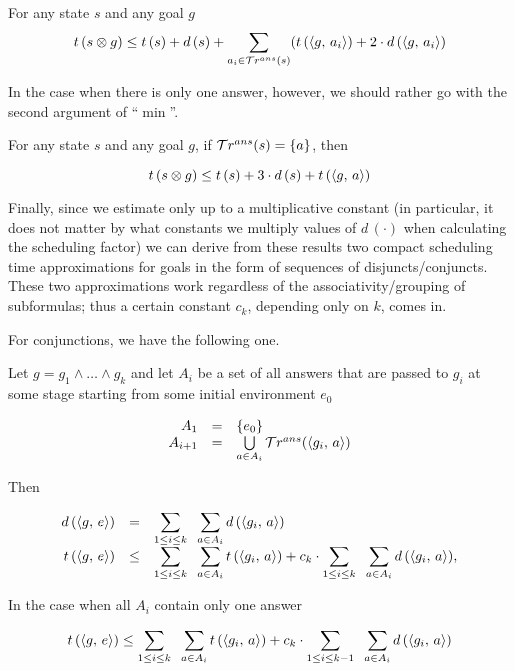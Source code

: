 \begin{corollary}
\label{lem:prod_estimation_multiple_answers}
For any state $s$ and any goal $g$
\[ t\,(s \otimes g) \le t\,(s) + d\,(s) +  \displaystyle\sum\limits_{a_i \in \mathcal{T}r^{ans}(s)} (t\,(\langle g ,\, a_i \rangle) + 2\cdot d\,(\langle g ,\, a_i \rangle) \]
\end{corollary}

In the case when there is only one answer, however, we should rather go with the second argument of ``$\min$''.

\begin{corollary}
\label{lem:prod_estimation_single_answer}
  For any state $s$ and any goal $g$, if $\mathcal{T}r^{ans}(s) = \{a\}$, then
  
\[ t\,(s \otimes g) \le t\,(s) + 3\cdot d\,(s) + t\,(\langle g ,\, a \rangle) \]
\end{corollary}

Finally, since we estimate only up to a multiplicative constant (in particular, it does not matter by what constants we multiply values of $d\,(\cdot)$ when calculating
the scheduling factor) we can derive from these results two compact scheduling time approximations for goals in the form of sequences of disjuncts/conjuncts.
These two approximations work regardless of the associativity/grouping of subformulas; thus a certain constant $c_k$, depending only on $k$, comes in.

For conjunctions, we have the following one.

\begin{lemma}
\label{lem:conjunction_metrics_calc}

Let $g = g_1 \land \dots \land g_k$ and let $A_i$ be a set of all answers that are passed to $g_i$ at some stage starting from some initial environment $e_0$

\[
\begin{array}{rcl}
A_1 &=& \{ e_0 \} \\
A_{i + 1} & = & \bigcup\limits_{a \in A_i} \mathcal{T}r^{ans}(\langle g_i ,\, a \rangle) 
\end{array}
\]

Then

\[
\begin{array}{rcl}
d\,(\langle g ,\, e \rangle) &=& \displaystyle\sum\limits_{1 \le i \le k} \;\; \displaystyle\sum\limits_{a \in A_i} d\,(\langle g_i ,\, a \rangle) \\
t\,(\langle g ,\, e \rangle) &\le& \displaystyle\sum\limits_{1 \le i \le k} \;\; \displaystyle\sum\limits_{a \in A_i} t\,(\langle g_i ,\, a \rangle) + c_k \cdot \displaystyle\sum\limits_{1 \le i \le k} \;\; \displaystyle\sum\limits_{a \in A_i} d\,(\langle g_i ,\, a \rangle), \\
\end{array}
\]

In the case when all $A_i$ contain only one answer

\[
t\,(\langle g ,\, e \rangle) \le \displaystyle\sum\limits_{1 \le i \le k} \;\; \displaystyle\sum\limits_{a \in A_i} t\,(\langle g_i ,\, a \rangle) + c_k \cdot \displaystyle \sum\limits_{1 \le i \le k - 1} \;\; \displaystyle\sum\limits_{a \in A_i} d\,(\langle g_i ,\, a \rangle)
\]

\end{lemma}

